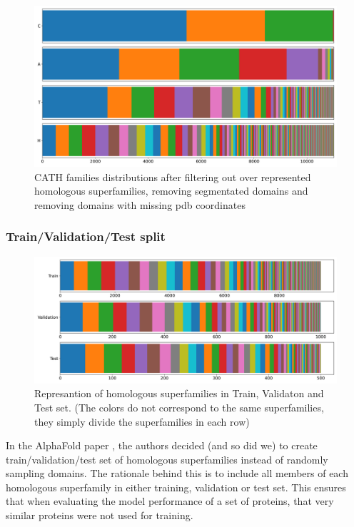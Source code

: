 \begin{figure}
    \centering
    \includegraphics[width=\linewidth]{imgs_tomas/cath_distributions_filtered.png}
    \caption{CATH families distributions after filtering out over represented homologous superfamilies, removing segmentated domains and removing domains with missing pdb coordinates}
    \label{fig:cath_filtered}
\end{figure}

\subsubsection{Train/Validation/Test split}

\begin{figure}
    \centering
    \includegraphics[width=\linewidth]{imgs_tomas/cath_distributions_trainvaltest.png}
    \caption{Represantion of homologous superfamilies in Train, Validaton and Test set. (The colors do not correspond to the same superfamilies, they simply divide the superfamilies in each row)}
    \label{fig:cath_trainvaltest}
\end{figure}

In the AlphaFold paper \cite{alphafold}, the authors decided (and so did we) to create train/validation/test set of homologous superfamilies instead of randomly sampling domains. 
The rationale behind this is to include all members of each homologous superfamily in either training, validation or test set. 
This ensures that when evaluating the model performance of a set of proteins, that very similar proteins were not used for training. 
    
